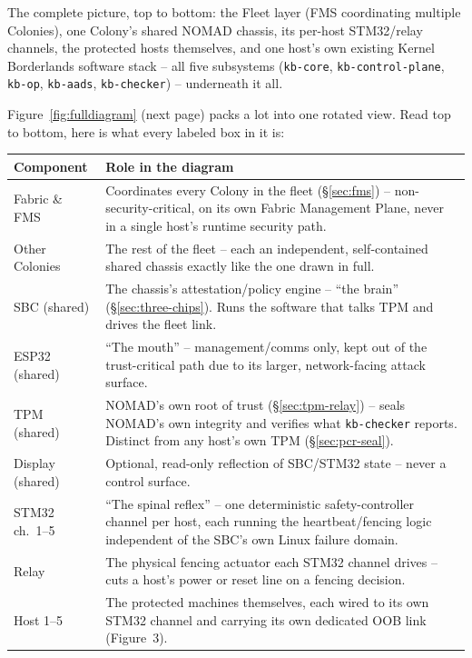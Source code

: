 \documentclass[11pt,a4paper]{article}
\begin{document}
The complete picture, top to bottom: the Fleet layer (FMS coordinating
multiple Colonies), one Colony's shared NOMAD chassis, its per-host
STM32/relay channels, the protected hosts themselves, and one host's
own existing Kernel Borderlands software stack -- all five subsystems
(\texttt{kb-core}, \texttt{kb-control-plane}, \texttt{kb-op},
\texttt{kb-aads}, \texttt{kb-checker}) -- underneath it all.

Figure~\ref{fig:fulldiagram} (next page) packs a lot into one rotated
view. Read top to bottom, here is what every labeled box in it is:

\begin{center}
\renewcommand{\arraystretch}{1.35}
\small
\begin{tabular}{@{}p{3.6cm}p{10.6cm}@{}}
\toprule
\textbf{Component} & \textbf{Role in the diagram} \\
\midrule
Fabric \& FMS & Coordinates every Colony in the fleet (\S\ref{sec:fms}) -- non-security-critical, on its own Fabric Management Plane, never in a single host's runtime security path. \\
Other Colonies & The rest of the fleet -- each an independent, self-contained shared chassis exactly like the one drawn in full. \\
SBC (shared) & The chassis's attestation/policy engine -- ``the brain'' (\S\ref{sec:three-chips}). Runs the software that talks TPM and drives the fleet link. \\
ESP32 (shared) & ``The mouth'' -- management/comms only, kept out of the trust-critical path due to its larger, network-facing attack surface. \\
TPM (shared) & NOMAD's own root of trust (\S\ref{sec:tpm-relay}) -- seals NOMAD's own integrity and verifies what \texttt{kb-checker} reports. Distinct from any host's own TPM (\S\ref{sec:pcr-seal}). \\
Display (shared) & Optional, read-only reflection of SBC/STM32 state -- never a control surface. \\
STM32 ch.~1--5 & ``The spinal reflex'' -- one deterministic safety-controller channel per host, each running the heartbeat/fencing logic independent of the SBC's own Linux failure domain. \\
Relay & The physical fencing actuator each STM32 channel drives -- cuts a host's power or reset line on a fencing decision. \\
Host 1--5 & The protected machines themselves, each wired to its own STM32 channel and carrying its own dedicated OOB link (Figure~3). \\

\end{tabular}
\end{center}
\end{document}
